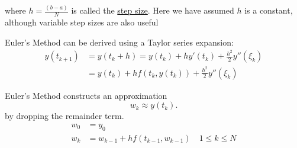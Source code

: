 where $h= \frac{(b-a)}{N}$ is called the \uline{step size}. Here we have assumed
$h$ is a constant, although variable step sizes are also useful

Euler's Method can be derived using a Taylor series expansion:
\begin{align*}
  y(t_{k+1}) &= y(t_k+h) = y(t_k) + hy'(t_k) + \frac{h^2}{2} y '' (\xi_k) \\
             &= y(t_k) + hf(t_k, y(t_k)) + \frac{h^2}{2}y''(\xi_k)
\end{align*}

Euler's Method constructs an approximation
\[
w_k \approx y(t_k)
.\]
by dropping the remainder term.
\begin{align*}
  w_0 &= y_0 \\
  w_k &= w_{k-1} + hf(t_{k-1}, w_{k-1}) \quad 1 \leq k \leq N\\
\end{align*}

